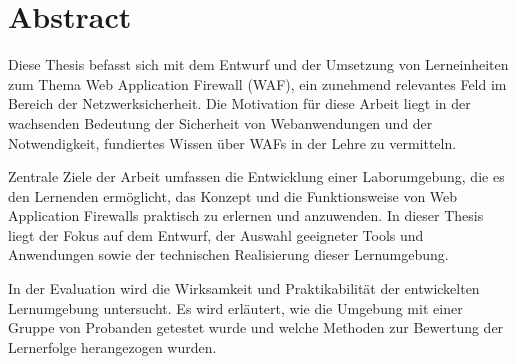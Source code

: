 \section{Abstract}
Diese Thesis befasst sich mit dem Entwurf und der Umsetzung von Lerneinheiten zum Thema Web Application Firewall (WAF), ein zunehmend relevantes Feld im Bereich der Netzwerksicherheit. 
Die Motivation für diese Arbeit liegt in der wachsenden Bedeutung der Sicherheit von Webanwendungen und der Notwendigkeit, fundiertes Wissen über WAFs in der Lehre zu vermitteln.

Zentrale Ziele der Arbeit umfassen die Entwicklung einer Laborumgebung, die es den Lernenden ermöglicht, das Konzept und die Funktionsweise von Web Application Firewalls praktisch zu erlernen und anzuwenden. 
In dieser Thesis liegt der Fokus auf dem Entwurf, der Auswahl geeigneter Tools und Anwendungen sowie der technischen Realisierung dieser Lernumgebung.

In der Evaluation wird die Wirksamkeit und Praktikabilität der entwickelten Lernumgebung untersucht. 
Es wird erläutert, wie die Umgebung mit einer Gruppe von Probanden getestet wurde und welche Methoden zur Bewertung der Lernerfolge herangezogen wurden. 

\pagebreak